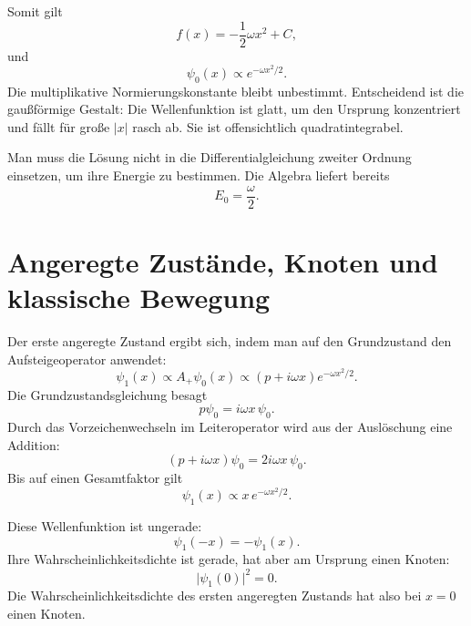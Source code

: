 \begin{classroomqa}
\end{classroomqa}

Somit gilt
\begin{equation}
f(x)=-\frac12\omega x^{2}+C,
\end{equation}
und
\begin{equation}
\psi_{0}(x)\propto e^{-\omega x^{2}/2}.
\end{equation}
Die multiplikative Normierungskonstante bleibt unbestimmt. Entscheidend ist die gaußförmige Gestalt: Die Wellenfunktion ist glatt, um den Ursprung konzentriert und fällt für große \(\lvert x\rvert\) rasch ab. Sie ist offensichtlich quadratintegrabel.

Man muss die Lösung nicht in die Differentialgleichung zweiter Ordnung einsetzen, um ihre Energie zu bestimmen. Die Algebra liefert bereits
\begin{equation}
E_{0}=\frac{\omega}{2}.
\end{equation}

\section{Angeregte Zustände, Knoten und klassische Bewegung}

Der erste angeregte Zustand ergibt sich, indem man auf den Grundzustand den Aufsteigeoperator anwendet:
\begin{equation}
\psi_{1}(x)\propto A_{+}\psi_{0}(x)
\propto(p+i\omega x)e^{-\omega x^{2}/2}.
\end{equation}
Die Grundzustandsgleichung besagt
\[
p\psi_{0}=i\omega x\,\psi_{0}.
\]
Durch das Vorzeichenwechseln im Leiteroperator wird aus der Auslöschung eine Addition:
\begin{equation}
(p+i\omega x)\psi_{0}
=2i\omega x\,\psi_{0}.
\end{equation}
Bis auf einen Gesamtfaktor gilt
\begin{equation}
\psi_{1}(x)\propto x\,e^{-\omega x^{2}/2}.
\end{equation}

Diese Wellenfunktion ist ungerade:
\begin{equation}
\psi_{1}(-x)=-\psi_{1}(x).
\end{equation}
Ihre Wahrscheinlichkeitsdichte ist gerade, hat aber am Ursprung einen Knoten:
\begin{equation}
\lvert\psi_{1}(0)\rvert^{2}=0.
\end{equation}
Die Wahrscheinlichkeitsdichte des ersten angeregten Zustands hat also bei \(x=0\) einen Knoten.


